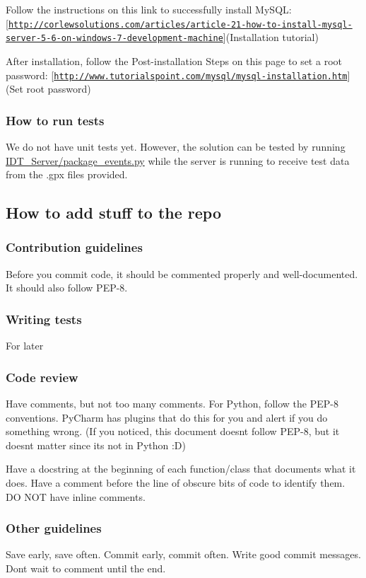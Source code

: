 Follow the instructions on this link to successfully install My\+S\+QL\+: \mbox{[}\href{http://corlewsolutions.com/articles/article-21-how-to-install-mysql-server-5-6-on-windows-7-development-machine}{\tt http\+://corlewsolutions.\+com/articles/article-\/21-\/how-\/to-\/install-\/mysql-\/server-\/5-\/6-\/on-\/windows-\/7-\/development-\/machine}\mbox{]}(Installation tutorial)

After installation, follow the Post-\/installation Steps on this page to set a root password\+: \mbox{[}\href{http://www.tutorialspoint.com/mysql/mysql-installation.htm}{\tt http\+://www.\+tutorialspoint.\+com/mysql/mysql-\/installation.\+htm}\mbox{]}(Set root password)

\subsubsection*{How to run tests}

We do not have unit tests yet. However, the solution can be tested by running {\ttfamily \hyperlink{package__events_8py}{I\+D\+T\+\_\+\+Server/package\+\_\+events.\+py}} while the server is running to receive test data from the {\ttfamily .gpx} files provided.

\subsection*{How to add stuff to the repo}

\subsubsection*{Contribution guidelines}

Before you commit code, it should be commented properly and well-\/documented. It should also follow P\+E\+P-\/8.

\subsubsection*{Writing tests}

For later

\subsubsection*{Code review}

Have comments, but not too many comments. For Python, follow the P\+E\+P-\/8 conventions. Py\+Charm has plugins that do this for you and alert if you do something wrong. (If you noticed, this document doesn\textquotesingle{}t follow P\+E\+P-\/8, but it doesn\textquotesingle{}t matter since it\textquotesingle{}s not in Python \+:D)

Have a docstring at the beginning of each function/class that documents what it does. Have a comment before the line of obscure bits of code to identify them. DO N\+OT have inline comments.

\subsubsection*{Other guidelines}

Save early, save often. Commit early, commit often. Write good commit messages. Don\textquotesingle{}t wait to comment until the end. 